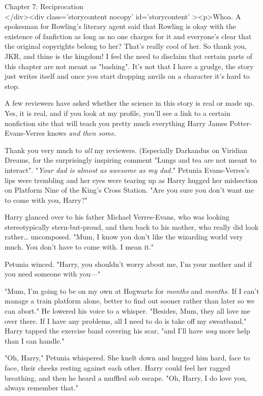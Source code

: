 
Chapter 7: Reciprocation\\
</div><div  class='storycontent nocopy' id='storycontent' ><p>Whoa. A spokesman 
for Rowling's literary agent said that Rowling is okay with the existence of 
fanfiction as long as no one charges for it and everyone's clear that the 
original copyrights belong to her? That's really cool of her. So thank you, 
JKR, and thine is the kingdom!
\sbreak
I feel the need to disclaim that certain parts of this chapter are not meant as 
"bashing". It's not that I have a grudge, the story just writes itself and once 
you start dropping anvils on a character it's hard to stop.

A few reviewers have asked whether the science in this story is real or made 
up. Yes, it is real, and if you look at my profile, you'll see a link to a 
certain nonfiction site that will teach you pretty much everything Harry James 
Potter-Evans-Verres knows \emph{and then some}.

Thank you very much to \emph{all} my reviewers. (Especially Darkandus on 
Viridian Dreams, for the surprisingly inspiring comment "Lungs and tea are not 
meant to interact".
\sbreak
"\emph{Your dad is almost as awesome as my dad.}"
\sbreak
Petunia Evans-Verres's lips were trembling and her eyes were tearing up as 
Harry hugged her midsection on Platform Nine of the King's Cross Station. "Are 
you sure you don't want me to come with you, Harry?"

Harry glanced over to his father Michael Verres-Evans, who was looking 
stereotypically stern-but-proud, and then back to his mother, who really did 
look rather{\ldots} uncomposed. "Mum, I know you don't like the wizarding world 
very much. You don't have to come with. I mean it."

Petunia winced. "Harry, you shouldn't worry about me, I'm your mother and if 
you need someone with you---"

"Mum, I'm going to be on my own at Hogwarts for \emph{months} and 
\emph{months.} If I can't manage a train platform alone, better to find out 
sooner rather than later so we can abort." He lowered his voice to a whisper. 
"Besides, Mum, they all love me over there. If I have any problems, all I need 
to do is take off my sweatband," Harry tapped the exercise band covering his 
scar, "and I'll have \emph{way} more help than I can handle."

"Oh, Harry," Petunia whispered. She knelt down and hugged him hard, face to 
face, their cheeks resting against each other. Harry could feel her ragged 
breathing, and then he heard a muffled sob escape. "Oh, Harry, I do love you, 
always remember that."

